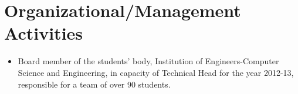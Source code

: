 \documentclass[11pt]{article}
\begin{document}
\section*{Organizational/Management Activities}
\begin{itemize}
	\item[] Board member of the students’ body, Institution of Engineers-Computer Science and Engineering, in capacity of Technical Head for the year 2012-13, responsible for a team of over 90 students.
\end{itemize}
\end{document}

